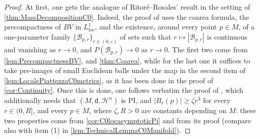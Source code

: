 \documentclass[a4paper,12pt,reqno]{amsart}
\numberwithin{equation}{section}
\theoremstyle{plain}
\theoremstyle{definition}
\theoremstyle{remark}
\newcommand{\dist}{\mathsf{d}}
\begin{document}
{\begin{proof}
{At first, one gets the analogue of Ritoré--Rosales' result \cite[Theorem 3.3]{ANP} in the setting of \cref{thm:MassDecompositionC0}. Indeed, the proof of \cite[Theorem 3.3]{ANP} uses the coarea formula, the precompactness of $BV$ in $L^1_{\mathrm{loc}}$, and the existence, around every point $p\in M$, of a one-parameter family $\{\mathcal{B}_{p,r}\}_{r\in (0,\varepsilon)}$ of sets such that $r\mapsto |\mathcal{B}_{p,r}|$ is continuous and vanishing as $r\to 0$, and $P(\mathcal{B}_{p,r})\to 0$ as $r\to 0$. The first two come from \cref{lem:PrecompactnessBV}, and \cref{thm:Coarea}, while for the last one it suffices to take pre-images of small Euclidean balls under the map in the second item of \cref{lem:LocalePiattezzaC0metrics}, as it has been done in the proof of \cref{cor:Continuity}. Once this is done, one follows verbatim the proof of \cite[Theorem 4.6]{AFP21}, which additionally needs that $(M,\dist,\mathcal{H}^n)$ is PI, and $|B_r(p)|\geq \zeta r^3$ for every $r\in (0,R]$, and every $p\in M$, where $\zeta,R>0$ are constants depending on $M$: these two properties come from \cref{cor:C0locasymptoticPi} and from its proof (compare also with item (1) in \cref{lem:TechnicalLemmaC0Manifold}). 

}
\end{proof}}
\end{document}
